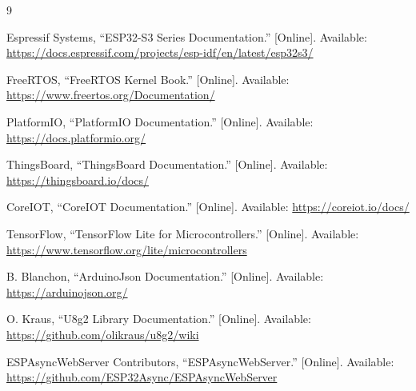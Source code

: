
\begin{thebibliography}{9}

Espressif Systems, ``ESP32-S3 Series Documentation.'' [Online]. Available: \url{https://docs.espressif.com/projects/esp-idf/en/latest/esp32s3/}

FreeRTOS, ``FreeRTOS Kernel Book.'' [Online]. Available: \url{https://www.freertos.org/Documentation/}

PlatformIO, ``PlatformIO Documentation.'' [Online]. Available: \url{https://docs.platformio.org/}

ThingsBoard, ``ThingsBoard Documentation.'' [Online]. Available: \url{https://thingsboard.io/docs/}

CoreIOT, ``CoreIOT Documentation.'' [Online]. Available: \url{https://coreiot.io/docs/}

TensorFlow, ``TensorFlow Lite for Microcontrollers.'' [Online]. Available: \url{https://www.tensorflow.org/lite/microcontrollers}

B. Blanchon, ``ArduinoJson Documentation.'' [Online]. Available: \url{https://arduinojson.org/}

O. Kraus, ``U8g2 Library Documentation.'' [Online]. Available: \url{https://github.com/olikraus/u8g2/wiki}

ESPAsyncWebServer Contributors, ``ESPAsyncWebServer.'' [Online]. Available: \url{https://github.com/ESP32Async/ESPAsyncWebServer}

\end{thebibliography}
